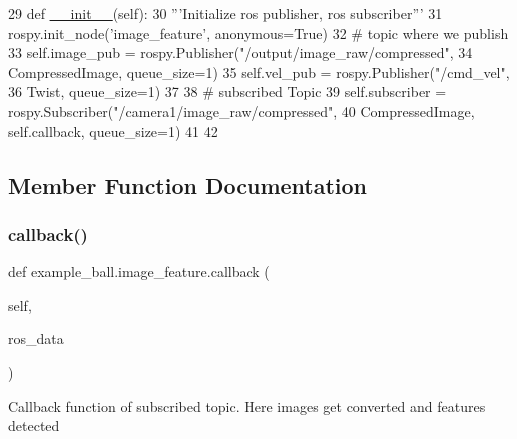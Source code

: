 \begin{DoxyCode}
29     \textcolor{keyword}{def }\hyperlink{classstate__machine_1_1Play_a5993a23d8be7f7b2647f71ede0334957}{\_\_init\_\_}(self):
30         \textcolor{stringliteral}{'''Initialize ros publisher, ros subscriber'''}
31         rospy.init\_node(\textcolor{stringliteral}{'image\_feature'}, anonymous=\textcolor{keyword}{True})
32      \textcolor{comment}{# topic where we publish}
33         self.image\_pub = rospy.Publisher(\textcolor{stringliteral}{"/output/image\_raw/compressed"},
34                                          CompressedImage, queue\_size=1)
35         self.vel\_pub = rospy.Publisher(\textcolor{stringliteral}{"/cmd\_vel"},
36                                        Twist, queue\_size=1)
37 
38         \textcolor{comment}{# subscribed Topic}
39         self.subscriber = rospy.Subscriber(\textcolor{stringliteral}{"/camera1/image\_raw/compressed"},
40                                            CompressedImage, self.callback,  queue\_size=1)
41 
42 
\end{DoxyCode}


\subsection{Member Function Documentation}
\mbox{\label{classexample__ball_1_1image__feature_ab9332c62c4aafa56c99505cac8173e84}} 
\subsubsection{\texorpdfstring{callback()}{callback()}\hspace{0.1cm}{\footnotesize\ttfamily [1/3]}}
{\footnotesize\ttfamily def example\+\_\+ball.\+image\+\_\+feature.\+callback (\begin{DoxyParamCaption}\item[{}]{self,  }\item[{}]{ros\+\_\+data }\end{DoxyParamCaption})}

\begin{DoxyVerb}Callback function of subscribed topic. 
Here images get converted and features detected\end{DoxyVerb}
 

